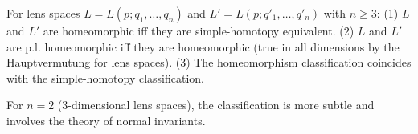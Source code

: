 For lens spaces $L = L(p; q_1, \ldots, q_n)$ and $L' = L(p; q'_1, \ldots, q'_n)$ with $n \geq 3$:
(1) $L$ and $L'$ are homeomorphic iff they are simple-homotopy equivalent.
(2) $L$ and $L'$ are p.l. homeomorphic iff they are homeomorphic (true in all dimensions by the Hauptvermutung for lens spaces).
(3) The homeomorphism classification coincides with the simple-homotopy classification.

For $n = 2$ (3-dimensional lens spaces), the classification is more subtle and involves the theory of normal invariants.
